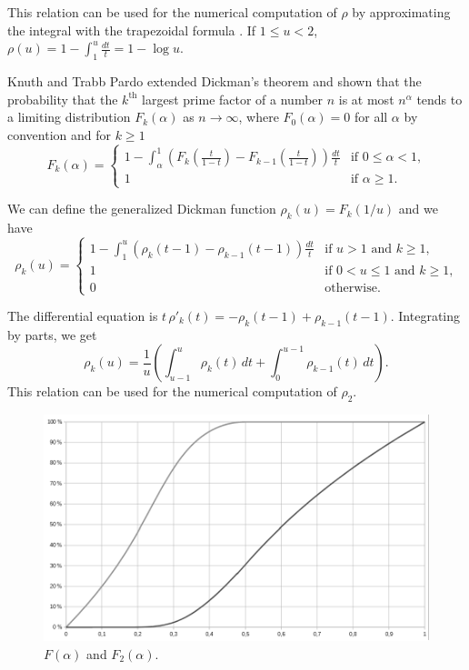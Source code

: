 \documentclass[a4paper, 11pt, pdftex]{report}
\theoremstyle{plain}
\theoremstyle{definition}
\begin{document}
This relation can be used for the numerical computation of $\rho$ by approximating the integral
with the trapezoidal formula \cite{LuneWattel1}. If $1 \leq u < 2$,
$\rho(u) = 1 - \int_1^u \frac{dt}{t} = 1 - \log u$.

Knuth and Trabb Pardo \cite{KnuthPardo1} extended Dickman's theorem and shown that the
probability that the $k^\text{th}$ largest prime factor of a number $n$ is at most $n^\alpha$
tends to a limiting distribution $F_k(\alpha)$ as $n \to \infty$, where $F_0(\alpha) = 0$ for all
$\alpha$ by convention and for $k \geq 1$
\begin{equation*}
F_k(\alpha) = \begin{cases}
1 - \int_\alpha^1 \left( F_k \left(\frac{t}{1-t} \right) - F_{k-1} \left(\frac{t}{1-t} \right) \right) \frac{dt}{t} & \text{if } 0 \leq \alpha < 1 \text{,}\\
1& \text{if } \alpha \geq 1 \text{.}
\end{cases}
\end{equation*}

We can define the generalized Dickman function $\rho_k(u) = F_k(1/u)$ and we have
\begin{equation*}
\rho_k(u) = \begin{cases}
1 - \int_1^u \left( \rho_k(t - 1) - \rho_{k-1}(t - 1) \right) \frac{dt}{t}
  & \text{if } u > 1 \text{ and } k\geq 1\text{,}\\
1& \text{if } 0 < u \leq 1 \text{ and } k\geq 1\text{,}\\
0& \text{otherwise.}
\end{cases}
\end{equation*}

The differential equation is $t\, \rho'_k(t) = -\rho_k(t - 1) + \rho_{k-1}(t - 1)$.
Integrating by parts, we get
$$\rho_k(u) = \frac{1}{u} \left( \int_{u-1}^u \rho_k(t)\, dt + \int_0^{u-1} \rho_{k-1}(t)\, dt \right).$$
This relation can be used for the numerical computation of $\rho_2$.

\begin{figure}[!ht]
	\centering
	\includegraphics[width=15.5cm, angle=0]{img/F_12.pdf}
	\caption{\label{fig:F_12} $F(\alpha)$ and $F_2(\alpha)$.}
\end{figure}
\end{document}
